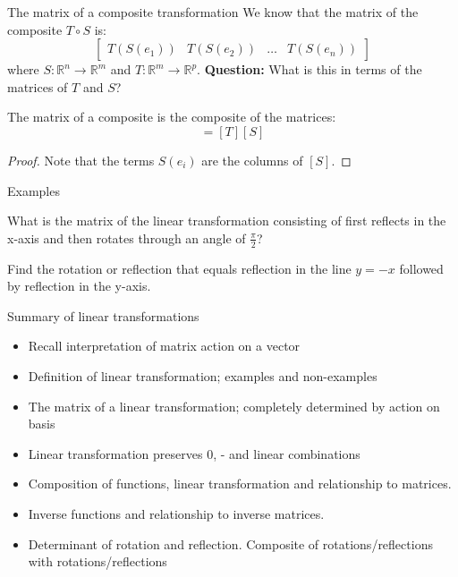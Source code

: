 \documentclass{beamer}
\begin{document}
\begin{frame}{The matrix of a composite transformation}
We know that the matrix of the composite $T\circ S$ is:
\begin{equation*}
\left[
\begin{array}{cccc}
T(S(e_1)) & T(S(e_2)) & \dots & T(S(e_n))
\end{array}
\right]
\end{equation*}
where $S: \mathbb{R}^n \rightarrow \mathbb{R}^m$ and $T: \mathbb{R}^m \rightarrow \mathbb{R}^p$.\vfill
{\bf Question:} What is this in terms of the matrices of $T$ and $S$?\vfill
\begin{theorem}
The matrix of a composite is the composite of the matrices:
\begin{equation*}
[T\circ S] = [T][S]
\end{equation*}
\begin{proof}
Note that the terms $S(e_i)$ are the columns of $[S]$.
\end{proof}
\end{theorem}
\end{frame}

\begin{frame}{Examples}
\begin{example}
What is the matrix of the linear transformation consisting of first reflects in the x-axis and then rotates through an angle of $\frac{\pi}{2}$?
\end{example}
\begin{example}
Find the rotation or reflection that equals reflection in the line $y = -x$ followed by reflection in the y-axis.
\end{example}
\end{frame}

\begin{frame}{Summary of linear transformations}
\begin{itemize}
	\item Recall interpretation of matrix action on a vector
	\item Definition of linear transformation; examples and non-examples
	\item The matrix of a linear transformation; completely determined by action on basis
	\item Linear transformation preserves 0, - and linear combinations
	\item Composition of functions, linear transformation and relationship to matrices.
	\item Inverse functions and relationship to inverse matrices.
	\item Determinant of rotation and reflection. Composite of rotations/reflections with rotations/reflections
\end{itemize}
\end{frame}
\end{document}

